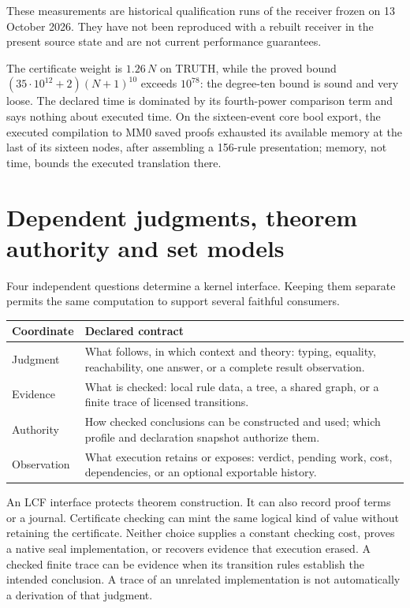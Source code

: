 \documentclass[11pt,a4paper]{article}
\theoremstyle{plain}
\theoremstyle{definition}
\theoremstyle{remark}
\begin{document}
These measurements are historical qualification runs of the receiver frozen
on 13 October 2026. They have not been reproduced with a rebuilt receiver in
the present source state and are not current performance guarantees.

The certificate weight is $1.26\,N$ on \textsf{TRUTH}, while the proved bound
$(35\cdot10^{12}+2)(N+1)^{10}$ exceeds $10^{78}$: the degree-ten bound is
sound and very loose. The declared time is dominated by its fourth-power
comparison term and says nothing about executed time. On the sixteen-event core
\textsf{bool} export, the executed compilation to MM0 saved proofs exhausted
its available memory at the last of its sixteen nodes, after assembling a
156-rule presentation; memory, not time, bounds the executed translation there.


\section{Dependent judgments, theorem authority and set models}\label{sec:dependent}

Four independent questions determine a kernel interface. Keeping them
separate permits the same computation to support several faithful consumers.

\begin{center}\small
\begin{tabularx}{\linewidth}{@{}lX@{}}
\toprule
Coordinate & Declared contract \\
\midrule
Judgment & What follows, in which context and theory: typing, equality,
reachability, one answer, or a complete result observation. \\
Evidence & What is checked: local rule data, a tree, a shared graph, or a
finite trace of licensed transitions. \\
Authority & How checked conclusions can be constructed and used; which
profile and declaration snapshot authorize them. \\
Observation & What execution retains or exposes: verdict, pending work,
cost, dependencies, or an optional exportable history. \\
\bottomrule
\end{tabularx}\end{center}

An LCF interface protects theorem construction. It can also record proof
terms or a journal. Certificate checking can mint the same logical kind of
value without retaining the certificate. Neither choice supplies a constant
checking cost, proves a native seal implementation, or recovers evidence
that execution erased. A checked finite trace can be evidence when its
transition rules establish the intended conclusion. A trace of an unrelated
implementation is not automatically a derivation of that judgment.
\end{document}
